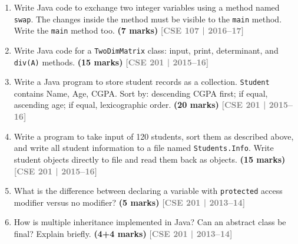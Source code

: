 \documentclass[12pt,a3paper]{article}
\newcommand{\yr}[1]{\hfill\textcolor{gray}{\small\textbf{[#1]}}}
\newcommand{\mk}[1]{\textcolor{orange!70!black}{\small\textbf{(#1 marks)}}}
\begin{document}
\begin{enumerate}



\item Write Java code to exchange two integer variables using a method named \texttt{swap}. The changes inside the method must be visible to the \texttt{main} method. Write the \texttt{main} method too. \mk{7}
\yr{CSE 107 | 2016--17}




\item Write Java code for a \texttt{TwoDimMatrix} class: input, print, determinant, and \texttt{div(A)} methods. \mk{15}
\yr{CSE 201 | 2015--16}




\item Write a Java program to store student records as a collection. \texttt{Student} contains Name, Age, CGPA. Sort by: descending CGPA first; if equal, ascending age; if equal, lexicographic order. \mk{20}
\yr{CSE 201 | 2015--16}




\item Write a program to take input of 120 students, sort them as described above, and write all student information to a file named \texttt{Students.Info}. Write student objects directly to file and read them back as objects. \mk{15}
\yr{CSE 201 | 2015--16}




\item What is the difference between declaring a variable with \texttt{protected} access modifier versus no modifier? \mk{5}
\yr{CSE 201 | 2013--14}




\item How is multiple inheritance implemented in Java? Can an abstract class be final? Explain briefly. \mk{4+4}
\yr{CSE 201 | 2013--14}





\end{enumerate}
\end{document}
